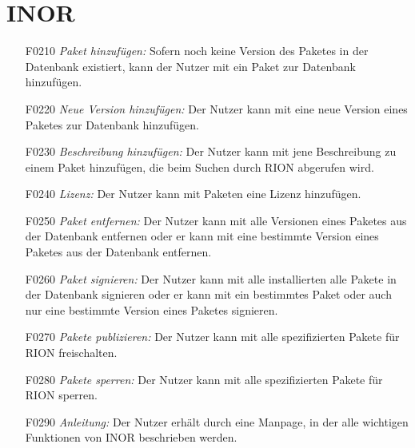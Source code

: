 \section{INOR}

\begin{itemize}
	\item[F0210] \textit{Paket hinzufügen:} Sofern noch keine Version des Paketes in der Datenbank existiert, kann der Nutzer mit  ein Paket zur Datenbank hinzufügen.
	\item[F0220] \textit{Neue Version hinzufügen:} Der Nutzer kann mit  eine neue Version eines Paketes zur Datenbank hinzufügen.
	\item[F0230] \textit{Beschreibung hinzufügen:} Der Nutzer kann mit  jene Beschreibung zu einem Paket hinzufügen, die beim Suchen durch RION abgerufen wird.
	\item[F0240] \textit{Lizenz:} Der Nutzer kann mit  Paketen eine Lizenz hinzufügen.
	\item[F0250] \textit{Paket entfernen:} Der Nutzer kann mit  alle Versionen eines Paketes aus der Datenbank entfernen oder er kann mit  eine bestimmte Version eines Paketes aus der Datenbank entfernen.
	\item[F0260] \textit{Paket signieren:} Der Nutzer kann mit  alle installierten alle Pakete in der Datenbank signieren oder er kann mit  ein bestimmtes Paket oder auch nur eine bestimmte Version eines Paketes signieren.
	\item[F0270] \textit{Pakete publizieren:} Der Nutzer kann mit  alle spezifizierten Pakete für RION freischalten.
	\item[F0280] \textit{Pakete sperren:} Der Nutzer kann mit  alle spezifizierten Pakete für RION sperren.
	\item[F0290] \textit{Anleitung:} Der Nutzer erhält durch  eine Manpage, in der alle wichtigen Funktionen von INOR beschrieben werden.


\end{itemize}
